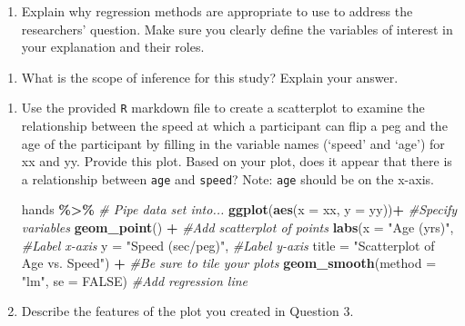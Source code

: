 \documentclass[
]{report}
\newenvironment{Shaded}{\begin{snugshade}}{\end{snugshade}}
\newcommand{\CommentTok}[1]{\textcolor[rgb]{0.56,0.35,0.01}{\textit{#1}}}
\newcommand{\DataTypeTok}[1]{\textcolor[rgb]{0.13,0.29,0.53}{#1}}
\newcommand{\KeywordTok}[1]{\textcolor[rgb]{0.13,0.29,0.53}{\textbf{#1}}}
\newcommand{\NormalTok}[1]{#1}
\newcommand{\OperatorTok}[1]{\textcolor[rgb]{0.81,0.36,0.00}{\textbf{#1}}}
\newcommand{\OtherTok}[1]{\textcolor[rgb]{0.56,0.35,0.01}{#1}}
\newcommand{\StringTok}[1]{\textcolor[rgb]{0.31,0.60,0.02}{#1}}
\providecommand{\tightlist}{%
  \setlength{\itemsep}{0pt}\setlength{\parskip}{0pt}}
\begin{document}
\begin{enumerate}
\def\labelenumi{\arabic{enumi}.}
\tightlist
\item
  Explain why regression methods are appropriate to use to address the researchers' question. Make sure you clearly define the variables of interest in your explanation and their roles.
\end{enumerate}

\vspace{1in}

\begin{enumerate}
\def\labelenumi{\arabic{enumi}.}
\setcounter{enumi}{1}
\tightlist
\item
  What is the scope of inference for this study? Explain your answer.
\end{enumerate}

\vspace{1in}

\begin{enumerate}
\def\labelenumi{\arabic{enumi}.}
\setcounter{enumi}{2}
\item
  Use the provided \texttt{R} markdown file to create a scatterplot to examine the relationship between the speed at which a participant can flip a peg and the age of the participant by filling in the variable names (`speed' and `age') for xx and yy. Provide this plot. Based on your plot, does it appear that there is a relationship between \texttt{age} and \texttt{speed}? Note: \texttt{age} should be on the x-axis.

\begin{Shaded}
\begin{Highlighting}[]
\NormalTok{hands }\OperatorTok{\%\textgreater{}\%}\StringTok{ }\CommentTok{\# Pipe data set into...}
\KeywordTok{ggplot}\NormalTok{(}\KeywordTok{aes}\NormalTok{(}\DataTypeTok{x =}\NormalTok{ xx, }\DataTypeTok{y =}\NormalTok{ yy))}\OperatorTok{+}\StringTok{  }\CommentTok{\#Specify variables}
\StringTok{  }\KeywordTok{geom\_point}\NormalTok{() }\OperatorTok{+}\StringTok{  }\CommentTok{\#Add scatterplot of points}
\StringTok{  }\KeywordTok{labs}\NormalTok{(}\DataTypeTok{x =} \StringTok{"Age (yrs)"}\NormalTok{,  }\CommentTok{\#Label x{-}axis}
       \DataTypeTok{y =} \StringTok{"Speed (sec/peg)"}\NormalTok{,  }\CommentTok{\#Label y{-}axis}
       \DataTypeTok{title =} \StringTok{"Scatterplot of Age vs. Speed"}\NormalTok{) }\OperatorTok{+}\StringTok{ }\CommentTok{\#Be sure to tile your plots}
\StringTok{  }\KeywordTok{geom\_smooth}\NormalTok{(}\DataTypeTok{method =} \StringTok{"lm"}\NormalTok{, }\DataTypeTok{se =} \OtherTok{FALSE}\NormalTok{)  }\CommentTok{\#Add regression line}
\end{Highlighting}
\end{Shaded}

  \vspace{2in}
\item
  Describe the features of the plot you created in Question 3.
\end{enumerate}
\end{document}
